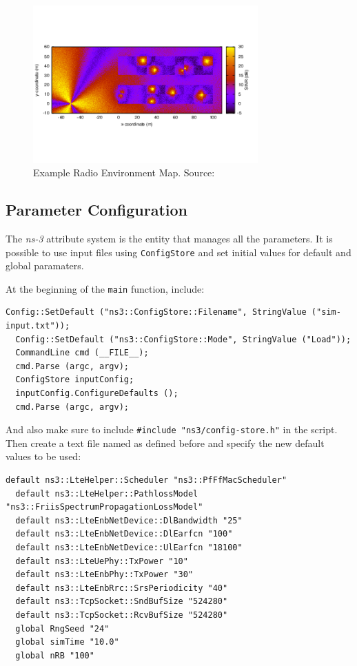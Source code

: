\begin{figure}[h]
  \centering
  \includegraphics[width=0.77\textwidth]{img/rem.png}
  \caption{Example Radio Environment Map. Source:\cite{ns3} }
  \label{fig:rem}
\end{figure}

\subsection{Parameter Configuration}
The \textit{ns-3} attribute system is the entity that manages all the parameters. It is 
possible to use input files using \texttt{ConfigStore} and set initial values for default 
and global paramaters.

At the beginning of the \texttt{main} function, include:

\begin{lstlisting}[language=myC++, caption={Configuration parameters}, captionpos=b]
  Config::SetDefault ("ns3::ConfigStore::Filename", StringValue ("sim-input.txt"));
  Config::SetDefault ("ns3::ConfigStore::Mode", StringValue ("Load"));
  CommandLine cmd (__FILE__);
  cmd.Parse (argc, argv);
  ConfigStore inputConfig;
  inputConfig.ConfigureDefaults ();
  cmd.Parse (argc, argv);
\end{lstlisting}

And also make sure to include \texttt{\#include "ns3/config-store.h"} in the script. Then create
a text file named as defined before and specify the new default values to be used:

\begin{lstlisting}[language=myshell, caption={Configuration parameters}, captionpos=b]
  default ns3::LteHelper::Scheduler "ns3::PfFfMacScheduler"
  default ns3::LteHelper::PathlossModel "ns3::FriisSpectrumPropagationLossModel"
  default ns3::LteEnbNetDevice::DlBandwidth "25"
  default ns3::LteEnbNetDevice::DlEarfcn "100"
  default ns3::LteEnbNetDevice::UlEarfcn "18100"
  default ns3::LteUePhy::TxPower "10"
  default ns3::LteEnbPhy::TxPower "30"
  default ns3::LteEnbRrc::SrsPeriodicity "40"
  default ns3::TcpSocket::SndBufSize "524280"
  default ns3::TcpSocket::RcvBufSize "524280"
  global RngSeed "24"
  global simTime "10.0"
  global nRB "100"
\end{lstlisting}
